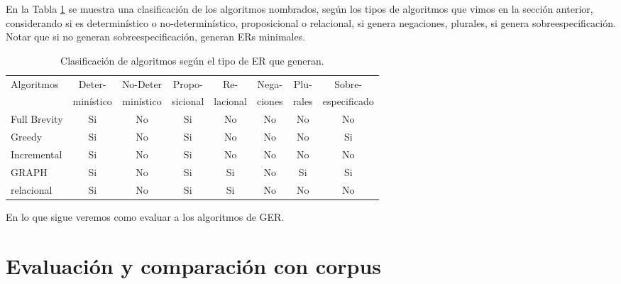 En la Tabla \ref{clasificacion_algoritmos} se muestra una clasificaci\'on de los algoritmos nombrados, seg\'un los tipos de algoritmos que vimos en la secci\'on anterior, 
considerando si es determin\'istico o no-determin\'istico, proposicional o relacional, 
si genera negaciones, plurales, si genera sobreespecificaci\'on. Notar que si no generan sobreespecificaci\'on, generan ERs minimales.
\label{sec:algoritmos_area}

\begin{table}[H]
\begin{center}
\begin{tabular}{|l|c|c|c|c|c|c|c|}
\hline
 Algoritmos& Deter- & No-Deter & Propo- & Re- & Nega- & Plu- & Sobre- \\
 & min\'istico & min\'istico & sicional & lacional & ciones & rales & especificado \\
\hline
Full Brevity &Si & No&Si&No&No&No& No \\
Greedy&Si & No&Si&No&No&No& Si \\
Incremental&Si & No&Si&No&No&No& No \\
GRAPH&Si & No&Si&Si&No&Si& Si \\ 
relacional&Si & No&Si&Si&No&No& No \\
\hline

\end{tabular}
\caption{Clasificaci\'on de algoritmos seg\'un el tipo de ER que generan.} 
\label{clasificacion_algoritmos}
\vspace*{-.5cm}
\end{center}
\end{table}



En lo que sigue veremos como evaluar a los algoritmos de GER.





\section{Evaluaci\'on y comparaci\'on con corpus}


